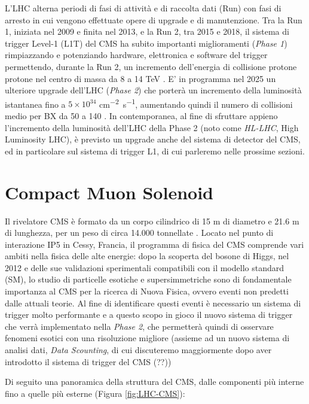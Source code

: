 L'LHC alterna periodi di fasi di attività e di raccolta dati (Run) con fasi di arresto in cui vengono effettuate opere di upgrade e di manutenzione. Tra la Run 1, iniziata nel 2009 e finita nel 2013, e la Run 2, tra 2015 e 2018, il sistema di trigger Level-1 (L1T) del CMS ha subito importanti miglioramenti (\textit{Phase 1}) rimpiazzando e potenziando hardware, elettronica e software del trigger permettendo, durante la Run 2, un incremento dell'energia di collisione protone protone nel centro di massa da 8 a 14 TeV \cite{sirunyan2020performance}. E' in programma nel 2025 un ulteriore upgrade dell'LHC (\textit{Phase 2}) che porterà un incremento della luminosità istantanea fino a $5\times 10^{34}$ \si{cm^{-2} s^{-1}}, aumentando quindi il numero di collisioni medio per BX da 50 a 140 \cite{collaboration2021phase}. In contemporanea, al fine di sfruttare appieno l'incremento della luminosità dell'LHC della Phase 2 (noto come \textit{HL-LHC}, High Luminosity LHC), è previsto un upgrade anche del sistema di detector del CMS, ed in particolare sul sistema di trigger L1, di cui parleremo nelle prossime sezioni.

\section{Compact Muon Solenoid}

Il rivelatore CMS è formato da un corpo cilindrico di 15 m di diametro e 21.6 m di lunghezza, per un peso di circa 14.000 tonnellate \cite{MasterThesisNicLai}. Locato nel punto di interazione IP5 in Cessy, Francia, il programma di fisica del CMS comprende vari ambiti nella fisica delle alte energie: dopo la scoperta del bosone di Higgs, nel 2012 e delle sue validazioni sperimentali compatibili con il modello standard (SM), lo studio di particelle esotiche e supersimmetriche sono di fondamentale importanza al CMS per la ricerca di Nuova Fisica, ovvero eventi non predetti dalle attuali teorie. Al fine di identificare questi eventi è necessario un sistema di trigger molto performante \cite{sirunyan2020performance} e a questo scopo in gioco il nuovo sistema di trigger che verrà implementato nella \textit{Phase 2}, che permetterà quindi di osservare fenomeni esotici con una risoluzione migliore (assieme ad un nuovo sistema di analisi dati, \textit{Data Scounting}, di cui discuteremo maggiormente dopo aver introdotto il sistema di trigger del CMS (??))

Di seguito una panoramica della struttura del CMS, dalle componenti più interne fino a quelle più esterne (Figura \ref{fig:LHC-CMS}):

